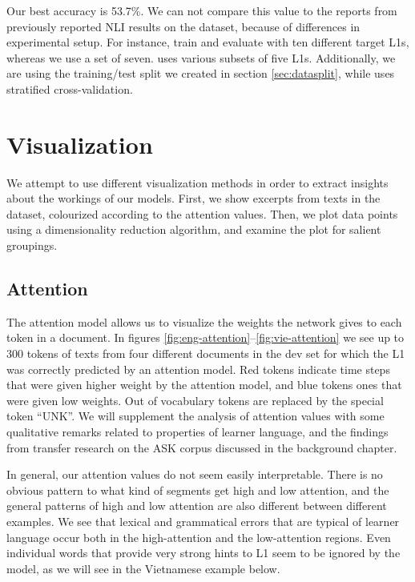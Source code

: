 Our best accuracy is 53.7\%. We can not compare this value to the reports from
previously reported \ac{NLI} results on the dataset, because of differences
in experimental setup. For instance, \textcite{malmasi2018native} train and
evaluate with ten different target \acp{L1}, whereas we use a set of seven.
\textcite{pepper2012} uses various subsets of five \acp{L1}. Additionally, we
are using the training/test split we created in section \ref{sec:datasplit},
while \textcite{malmasi2018native} uses stratified cross-validation.


\section{Visualization}

We attempt to use different visualization methods in order to extract
insights about the workings of our models. First, we show excerpts from texts
in the dataset, colourized according to the attention values. Then, we plot
data points using a dimensionality reduction algorithm, and examine the plot
for salient groupings.


\subsection{Attention} \label{subsec:attentionvis}

The attention model allows us to visualize the weights the network gives to
each token in a document. In figures
\ref{fig:eng-attention}--\ref{fig:vie-attention} we see up to 300 tokens of
texts from four different documents in the dev set for which the L1 was
correctly predicted by an attention model. Red tokens indicate time steps
that were given higher weight by the attention model, and blue tokens ones
that were given low weights. Out of vocabulary tokens are replaced by the
special token ``UNK''. We will supplement the analysis of attention values
with some qualitative remarks related to properties of learner language, and
the findings from transfer research on the ASK corpus discussed in the
background chapter.

In general, our attention values do not seem easily interpretable. There is
no obvious pattern to what kind of segments get high and low attention, and
the general patterns of high and low attention are also different between
different examples. We see that lexical and grammatical errors that are
typical of learner language occur both in the high-attention and the
low-attention regions. Even individual words that provide very strong hints
to \ac{L1} seem to be ignored by the model, as we will see in the Vietnamese
example below.

